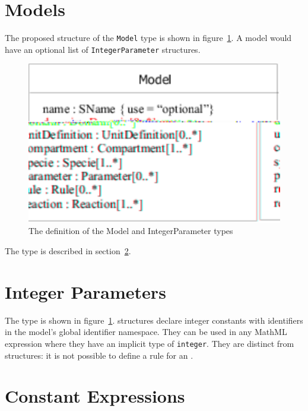 \documentclass{cekarticle}
\begin{document}
\section{Models}

The proposed structure of the \texttt{Model} type is shown in
figure~\ref{fig:model}. A model would have an optional list of
\texttt{IntegerParameter} structures.

\begin{figure}[h]
  \vspace*{8pt}
  \centering
  \includegraphics[scale = 0.7]{model}
  \caption{The definition of the Model and IntegerParameter types}
  \label{fig:model}
\end{figure}

The  type is described in section~\ref{sec:integerParameters}.

\section{Integer Parameters}
\label{sec:integerParameters}

The  type is shown in figure~\ref{fig:model}.
 structures declare integer constants with identifiers in the model's global identifier namespace.
They can be used in any MathML expression where they have an implicit type of \texttt{integer}.
They are distinct from  structures: it is not possible to define a rule for an .

\section{Constant Expressions}
\label{sec:constantExpressions}
\end{document}
